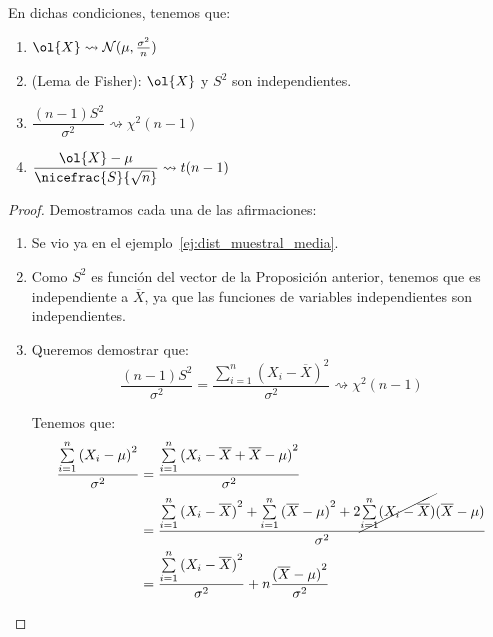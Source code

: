 \begin{coro}\label{cor:muestreo_1normal}
    En dichas condiciones, tenemos que:
    \begin{enumerate}
        \item $\ol{X}\rightsquigarrow \cc{N}(\mu, \frac{\sigma^2}{n})$
        \item (Lema de Fisher): $\ol{X}$ y $S^2$ son independientes.
        \item $\dfrac{(n-1)S^2}{\sigma^2}\rightsquigarrow \chi^2(n-1)$
        \item $\dfrac{\ol{X}-\mu}{\nicefrac{S}{\sqrt{n}}}\rightsquigarrow t(n-1)$
    \end{enumerate}
\begin{proof}
    Demostramos cada una de las afirmaciones:
    \begin{enumerate}
        \item Se vio ya en el ejemplo~\ref{ej:dist_muestral_media}.
        \item Como $S^2$ es función del vector de la Proposición anterior, tenemos que es independiente a $\overline{X}$, ya que las funciones de variables independientes son independientes.
        \item Queremos demostrar que:
            \begin{equation*}
                \dfrac{(n-1)S^2}{\sigma^2} = \dfrac{\sum\limits_{i=1}^n {(X_i - \overline{X})}^{2}}{\sigma^2} \rightsquigarrow\chi^2(n-1)
            \end{equation*}
            
            Tenemos que:
            \begin{align*}
                \dfrac{\sum\limits_{i=1}^n {(X_i - \mu)}^{2}}{\sigma^2} &= \dfrac{\sum\limits_{i=1}^n{(X_i - \overline{X} + \overline{X} - \mu)}^{2}}{\sigma^2} \\ 
                &= \dfrac{\sum\limits_{i=1}^n {(X_i - \overline{X})}^{2} + \sum\limits_{i=1}^n {(\overline{X}-\mu)}^{2} + 2\cancel{\sum\limits_{i=1}^n (X_i - \overline{X})}(\overline{X} - \mu)}{\sigma^2} \\
                &= \dfrac{\sum\limits_{i=1}^n {(X_i - \overline{X})}^{2} }{\sigma^2} + n \dfrac{{(\overline{X}-\mu)}^{2}}{\sigma^2}
            \end{align*}


\end{enumerate}
\end{proof}
\end{coro}
